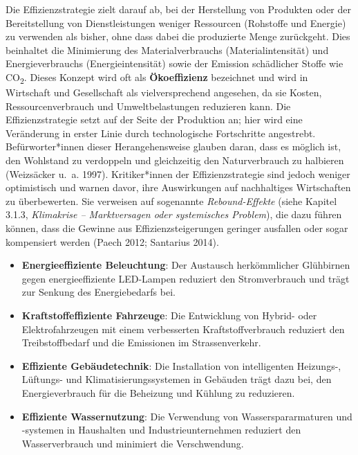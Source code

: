 \documentclass[
  nswissgerman,
  a4paper,
  DIV=11,
  numbers=noendperiod,
  oneside,
  openany]{scrreprt}
\providecommand{\tightlist}{%
  \setlength{\itemsep}{0pt}\setlength{\parskip}{0pt}}
\begin{document}
Die Effizienzstrategie zielt darauf ab, bei der Herstellung von
Produkten oder der Bereitstellung von Dienstleistungen weniger
Ressourcen (Rohstoffe und Energie) zu verwenden als bisher, ohne dass
dabei die produzierte Menge zurückgeht. Dies beinhaltet die Minimierung
des Materialverbrauchs (Materialintensität) und Energieverbrauchs
(Energieintensität) sowie der Emission schädlicher Stoffe wie
CO\textsubscript{2}. Dieses Konzept wird oft als \textbf{Ökoeffizienz}
bezeichnet und wird in Wirtschaft und Gesellschaft als vielversprechend
angesehen, da sie Kosten, Ressourcenverbrauch und Umweltbelastungen
reduzieren kann. Die Effizienzstrategie setzt auf der Seite der
Produktion an; hier wird eine Veränderung in erster Linie durch
technologische Fortschritte angestrebt. Befürworter*innen dieser
Herangehensweise glauben daran, dass es möglich ist, den Wohlstand zu
verdoppeln und gleichzeitig den Naturverbrauch zu halbieren (Weizsäcker
u.~a. 1997). Kritiker*innen der Effizienzstrategie sind jedoch weniger
optimistisch und warnen davor, ihre Auswirkungen auf nachhaltiges
Wirtschaften zu überbewerten. Sie verweisen auf sogenannte
\emph{Rebound-Effekte} (siehe Kapitel 3.1.3, \emph{Klimakrise --
Marktversagen oder systemisches Problem}), die dazu führen können, dass
die Gewinne aus Effizienzsteigerungen geringer ausfallen oder sogar
kompensiert werden (Paech 2012; Santarius 2014).

\begin{tcolorbox}[enhanced jigsaw, arc=.35mm, bottomrule=.15mm, bottomtitle=1mm, breakable, colback=white, colbacktitle=quarto-callout-tip-color!10!white, colframe=quarto-callout-tip-color-frame, coltitle=black, left=2mm, leftrule=.75mm, opacityback=0, opacitybacktitle=0.6, rightrule=.15mm, title={Beispiele Effizienzstrategie}, titlerule=0mm, toprule=.15mm, toptitle=1mm]

\begin{itemize}
\tightlist
\item
  \textbf{Energieeffiziente Beleuchtung}: Der Austausch herkömmlicher
  Glühbirnen gegen energieeffiziente LED-Lampen reduziert den
  Stromverbrauch und trägt zur Senkung des Energiebedarfs bei.
\item
  \textbf{Kraftstoffeffiziente Fahrzeuge}: Die Entwicklung von Hybrid-
  oder Elektrofahrzeugen mit einem verbesserten Kraftstoffverbrauch
  reduziert den Treibstoffbedarf und die Emissionen im Strassenverkehr.
\item
  \textbf{Effiziente Gebäudetechnik}: Die Installation von intelligenten
  Heizungs-, Lüftungs- und Klimatisierungssystemen in Gebäuden trägt
  dazu bei, den Energieverbrauch für die Beheizung und Kühlung zu
  reduzieren.
\item
  \textbf{Effiziente Wassernutzung}: Die Verwendung von
  Wasserspararmaturen und -systemen in Haushalten und
  Industrieunternehmen reduziert den Wasserverbrauch und minimiert die
  Verschwendung.
\end{itemize}

\end{tcolorbox}
\end{document}
